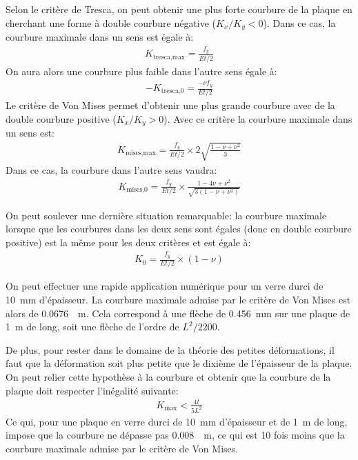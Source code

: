 \documentclass[11pt,titlepage]{article}
\begin{document}
Selon le critère de Tresca, on peut obtenir une plus forte courbure de la plaque en cherchant une forme à double courbure négative ($K_x/K_y < 0$). Dans ce cas, la courbure maximale dans un sens est égale à:
\begin{align}
K_{\text{tresca,max}} = \frac{f_y}{Et/2}
\end{align}
On aura alors une courbure plus faible dans l'autre sens égale à:
\begin{align}
    -K_{\text{tresca,0}} = \frac{-\nu f_y}{Et/2}
\end{align}
Le critère de Von Mises permet d'obtenir une plus grande courbure avec de la double courbure positive ($K_x/K_y > 0$). Avec ce critère la courbure maximale dans un sens est:
\begin{align}
K_{\text{mises,max}} = \frac{f_y}{Et/2}\times 2\sqrt{\frac{1-\nu+\nu^2}{3}}
\end{align}
Dans ce cas, la courbure dans l'autre sens vaudra:
\begin{align}
    K_{\text{mises,0}} = \frac{f_y}{Et/2}\times \frac{1-4\nu+\nu^2}{\sqrt{3(1-\nu+\nu^2)}}
\end{align}

On peut soulever une dernière situation remarquable: la courbure maximale lorsque que les courbures dans les deux sens sont égales (donc en double courbure positive) est la même pour les deux critères et est égale à:
\begin{align}
    K_0 = \frac{f_y}{Et/2}\times (1-\nu)
\end{align}

On peut effectuer une rapide application numérique pour un verre durci de \qty{10}{\milli\metre} d'épaisseur. La courbure maximale admise par le critère de Von Mises est alors de \qty{0.0676}{\per\metre}. Cela correspond à une flèche de \qty{0.456}{\milli\metre} sur une plaque de \qty{1}{\metre} de long, soit une flèche de l'ordre de $L^2/2200$. 

De plus, pour rester dans le domaine de la théorie des petites déformations, il faut que la déformation soit plus petite que le dixième de l'épaisseur de la plaque. On peut relier cette hypothèse à la courbure et obtenir que la courbure de la plaque doit respecter l'inégalité suivante:
\begin{align}
K_{\text{max}} < \frac{4t}{5L^2}
\end{align}
Ce qui, pour une plaque en verre durci de \qty{10}{\milli\metre} d'épaisseur et de \qty{1}{\metre} de long, impose que la courbure ne dépasse pas \qty{0.008}{\per\metre}, ce qui est 10 fois moins que la courbure maximale admise par le critère de Von Mises. 
\newpage
\end{document}
